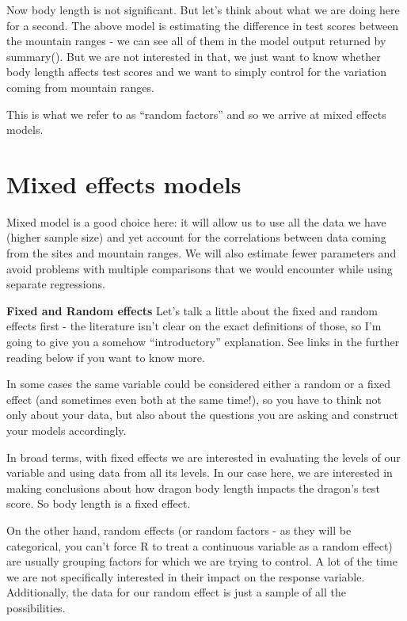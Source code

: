 \documentclass[
  letterpaper,
  DIV=11,
  numbers=noendperiod]{scrreprt}
\begin{document}
Now body length is not significant. But let's think about what we are
doing here for a second. The above model is estimating the difference in
test scores between the mountain ranges - we can see all of them in the
model output returned by summary(). But we are not interested in that,
we just want to know whether body length affects test scores and we want
to simply control for the variation coming from mountain ranges.

This is what we refer to as ``random factors'' and so we arrive at mixed
effects models.

\section{Mixed effects models}\label{mixed-effects-models}

Mixed model is a good choice here: it will allow us to use all the data
we have (higher sample size) and yet account for the correlations
between data coming from the sites and mountain ranges. We will also
estimate fewer parameters and avoid problems with multiple comparisons
that we would encounter while using separate regressions.

\textbf{Fixed and Random effects} Let's talk a little about the fixed
and random effects first - the literature isn't clear on the exact
definitions of those, so I'm going to give you a somehow
``introductory'' explanation. See links in the further reading below if
you want to know more.

In some cases the same variable could be considered either a random or a
fixed effect (and sometimes even both at the same time!), so you have to
think not only about your data, but also about the questions you are
asking and construct your models accordingly.

In broad terms, with fixed effects we are interested in evaluating the
levels of our variable and using data from all its levels. In our case
here, we are interested in making conclusions about how dragon body
length impacts the dragon's test score. So body length is a fixed
effect.

On the other hand, random effects (or random factors - as they will be
categorical, you can't force R to treat a continuous variable as a
random effect) are usually grouping factors for which we are trying to
control. A lot of the time we are not specifically interested in their
impact on the response variable. Additionally, the data for our random
effect is just a sample of all the possibilities.
\end{document}
